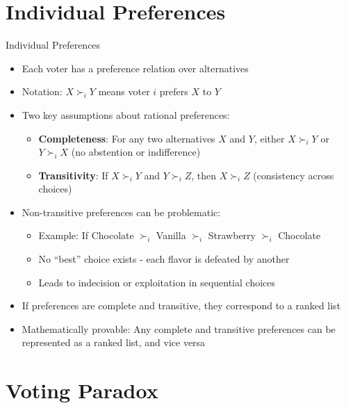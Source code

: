 \documentclass[10pt]{beamer}
\begin{document}
\section{Individual Preferences}

\begin{frame}{Individual Preferences}
  \begin{itemize}[<+->]
    \item Each voter has a preference relation over alternatives
    \item Notation: $X \succ_i Y$ means voter $i$ prefers $X$ to $Y$ 
    \item Two key assumptions about rational preferences:
      \begin{itemize}
        \item \textbf{Completeness}: For any two alternatives $X$ and $Y$, either $X \succ_i Y$ or $Y \succ_i X$ (no abstention or indifference)
        \item \textbf{Transitivity}: If $X \succ_i Y$ and $Y \succ_i Z$, then $X \succ_i Z$ (consistency across choices)
      \end{itemize}
    \item Non-transitive preferences can be problematic:
      \begin{itemize}
        \item Example: If Chocolate $\succ_i$ Vanilla $\succ_i$ Strawberry $\succ_i$ Chocolate
        \item No ``best'' choice exists - each flavor is defeated by another
        \item Leads to indecision or exploitation in sequential choices
      \end{itemize}
    \item If preferences are complete and transitive, they correspond to a ranked list
    \item Mathematically provable: Any complete and transitive preferences can be represented as a ranked list, and vice versa
  \end{itemize}
\end{frame}

\section{Voting Paradox}
\end{document}
